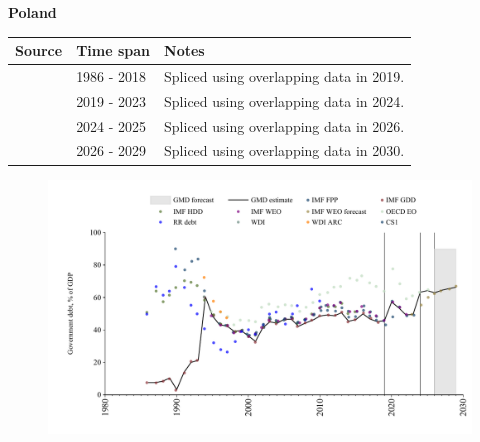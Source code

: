 \documentclass[12pt,a4paper,landscape]{article}
\begin{document}
\begin{adjustbox}{max totalsize={\paperwidth}{\paperheight},center}
\begin{minipage}[t][\textheight][t]{\textwidth}
\vspace*{0.5cm}
{}
\begin{center}
{\Large\bfseries Poland}
\end{center}
\vspace{0.5cm}
\begin{table}[H]
\centering
\small
\begin{tabular}{|l|l|l|}
\hline
\textbf{Source} & \textbf{Time span} & \textbf{Notes} \\
\hline
\rowcolor{white}\cite{IMF_GDD}& 1986 - 2018 &Spliced using overlapping data in 2019.\\
\rowcolor{lightgray}\cite{IMF_FPP}& 2019 - 2023 &Spliced using overlapping data in 2024.\\
\rowcolor{white}\cite{OECD_EO}& 2024 - 2025 &Spliced using overlapping data in 2026.\\
\rowcolor{lightgray}\cite{IMF_WEO_forecast}& 2026 - 2029 &Spliced using overlapping data in 2030.\\
\hline
\end{tabular}
\end{table}
\begin{figure}[H]
\centering
\includegraphics[width=\textwidth,height=0.6\textheight,keepaspectratio]{graphs/POL_govdebt_GDP.pdf}
\end{figure}
\end{minipage}
\end{adjustbox}
\end{document}
